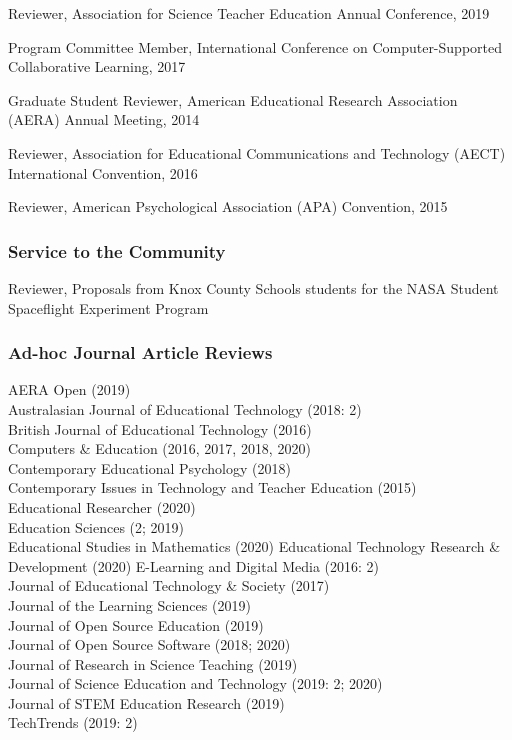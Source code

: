 \documentclass[
  14,
]{article}
\begin{document}
Reviewer, Association for Science Teacher Education Annual Conference,
2019

Program Committee Member, International Conference on Computer-Supported
Collaborative Learning, 2017

Graduate Student Reviewer, American Educational Research Association
(AERA) Annual Meeting, 2014

Reviewer, Association for Educational Communications and Technology
(AECT) International Convention, 2016

Reviewer, American Psychological Association (APA) Convention, 2015

\hypertarget{service-to-the-community}{%
\subsubsection{Service to the
Community}\label{service-to-the-community}}

Reviewer, Proposals from Knox County Schools students for the NASA
Student Spaceflight Experiment Program

\hypertarget{ad-hoc-journal-article-reviews}{%
\subsubsection{Ad-hoc Journal Article
Reviews}\label{ad-hoc-journal-article-reviews}}

AERA Open (2019)\\
Australasian Journal of Educational Technology (2018: 2)\\
British Journal of Educational Technology (2016)\\
Computers \& Education (2016, 2017, 2018, 2020)\\
Contemporary Educational Psychology (2018)\\
Contemporary Issues in Technology and Teacher Education (2015)\\
Educational Researcher (2020)\\
Education Sciences (2; 2019)\\
Educational Studies in Mathematics (2020) Educational Technology
Research \& Development (2020) E-Learning and Digital Media (2016: 2)\\
Journal of Educational Technology \& Society (2017)\\
Journal of the Learning Sciences (2019)\\
Journal of Open Source Education (2019)\\
Journal of Open Source Software (2018; 2020)\\
Journal of Research in Science Teaching (2019)\\
Journal of Science Education and Technology (2019: 2; 2020)\\
Journal of STEM Education Research (2019)\\
TechTrends (2019: 2)
\end{document}
